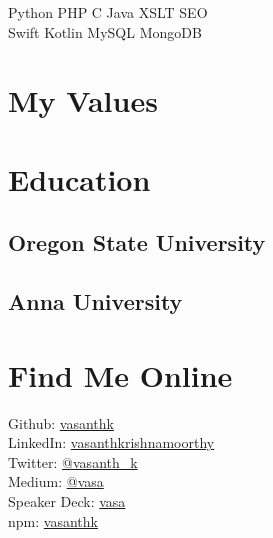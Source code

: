 \documentclass[]{my-resume-openfont}
\begin{document}
\begin{minipage}[t]{0.33\textwidth}
\vspace{2mm} %
Python \textbullet{} PHP \textbullet{} C \textbullet{} Java \textbullet{} XSLT \textbullet{} SEO \\
Swift \textbullet{} Kotlin \textbullet{} MySQL \textbullet{} MongoDB \\


\section{My Values}


\section{Education}

\subsection{Oregon State University}
\sectionsep

\subsection{Anna University}


\section{Find Me Online}
Github: \href{https://github.com/vasanthk}{vasanthk} \\
LinkedIn: \href{https://www.linkedin.com/in/vasanthkrishnamoorthy}{vasanthkrishnamoorthy} \\
Twitter: \href{https://twitter.com/vasanth_k}{@vasanth\_k} \\
Medium: \href{https://medium.com/@vasa}{@vasa} \\
Speaker Deck: \href{https://speakerdeck.com/vasa}{vasa} \\
npm: \href{https://www.npmjs.com/~vasanthk}{vasanthk}
\sectionsep

%
%

\end{minipage}
\end{document}
